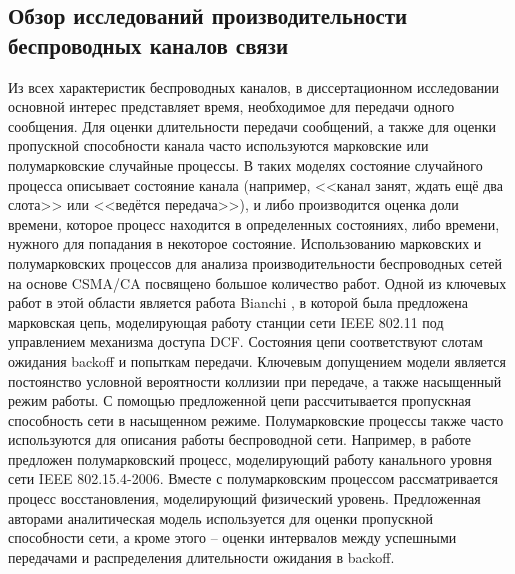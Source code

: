 \subsection{Обзор исследований производительности беспроводных каналов связи}\label{sec:ch1_wifi_observe}

Из всех характеристик беспроводных каналов, в диссертационном исследовании основной интерес представляет время, необходимое для передачи одного сообщения. Для оценки длительности передачи сообщений, а также для оценки пропускной способности канала часто используются марковские или полумарковские случайные процессы. В таких моделях состояние случайного процесса описывает состояние канала (например, <<канал занят, ждать ещё два слота>> или <<ведётся передача>>), и либо производится оценка доли времени, которое процесс находится в определенных состояниях, либо времени, нужного для попадания в некоторое состояние. Использованию марковских и полумарковских процессов для анализа производительности беспроводных сетей на основе CSMA/CA посвящено большое количество работ. Одной из ключевых работ в этой области является работа Bianchi \cite{Bianchi2000}, в которой была предложена марковская цепь, моделирующая работу станции сети IEEE 802.11 под управлением механизма доступа DCF. Состояния цепи соответствуют слотам ожидания backoff и попыткам передачи. Ключевым допущением модели является постоянство условной вероятности коллизии при передаче, а также насыщенный режим работы. С помощью предложенной цепи рассчитывается пропускная способность сети в насыщенном режиме. Полумарковские процессы также часто используются для описания работы беспроводной сети. Например, в работе \cite{Lauwens2010} предложен полумарковский процесс, моделирующий работу канального уровня сети IEEE 802.15.4-2006. Вместе с полумарковским процессом рассматривается процесс восстановления, моделирующий физический уровень. Предложенная авторами аналитическая модель используется для оценки пропускной способности сети, а кроме этого -- оценки интервалов между успешными передачами и распределения длительности ожидания в backoff.

